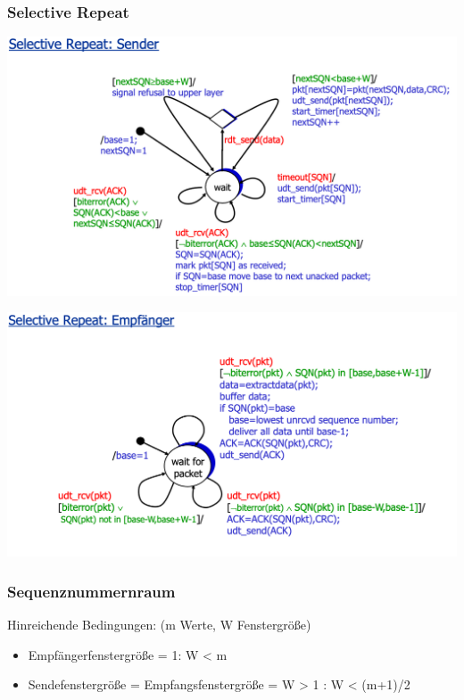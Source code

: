 \subsubsection{Selective Repeat}
\begin{multicols}{2}
\begin{center}
	\includegraphics[scale=0.125]{images/Selcetive_Repeat_Sender.png}
\end{center}
\begin{center}
	\includegraphics[scale=0.125]{images/Selective_Repeate_Empfaenger.png}
\end{center}
\end{multicols}
\subsubsection{Sequenznummernraum}
Hinreichende Bedingungen: (m Werte, W Fenstergröße)
\begin{itemize}
	\item Empfängerfenstergröße = 1: W < m
	\item Sendefenstergröße = Empfangsfenstergröße = W > 1 : W < (m+1)/2
\end{itemize} 
